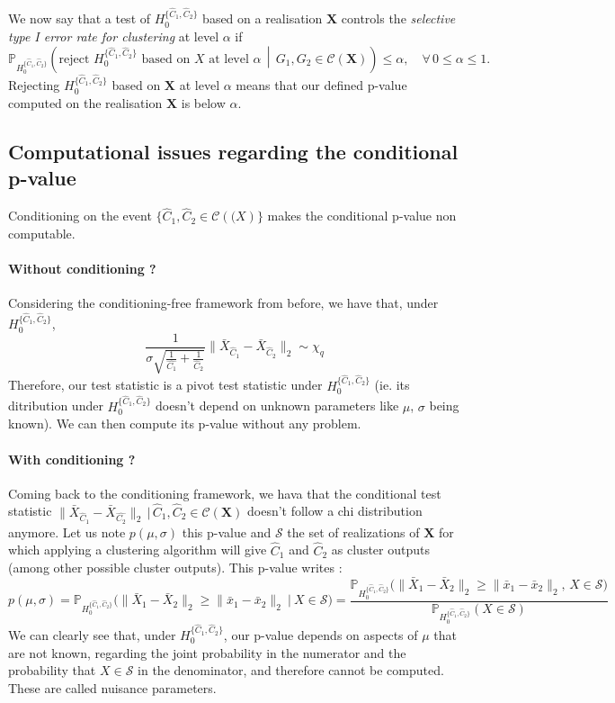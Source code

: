 \documentclass[11pt,a4paper]{article}
\newcommand{\C}{\mathcal{C}}                       %
\newcommand{\norm}[1]{\lVert #1 \rVert_2}          %
\newcommand{\Hzero}{H_0^{\{\hat{C}_1,\hat{C}_2\}}} %
\begin{document}
We now say that a test of $\Hzero$ based on a realisation $\mathbf{X}$ controls the \textit{selective type I error rate for clustering} at level $\alpha$ if
\[
\mathbb{P}_{\Hzero}\left( \text{reject } \Hzero \text{ based on } X \text{ at level } \alpha \,\middle|\, G_1, G_2 \in \C(\mathbf{X}) \right) \leq \alpha, \quad \forall\, 0 \leq \alpha \leq 1.
\]
Rejecting $\Hzero$ based on $\mathbf{X}$ at level $\alpha$ means that our defined p-value computed on the realisation $\mathbf{X}$ is below $\alpha$.

\subsection{Computational issues regarding the conditional p-value}

Conditioning on the event $\{\hat{C}_1, \hat{C}_2 \in \C(\mathbf(X)\}$ makes the conditional p-value non computable.

\paragraph{Without conditioning ?} Considering the conditioning-free framework from before, we have that, under $\Hzero$,
\[
\frac{1}{\sigma\sqrt{\frac{1}{\hat{C_1}} + \frac{1}{\hat{C}_2}}}\norm{\bar{X}_{\hat{C}_1} - \bar{X}_{\hat{C}_2}} \sim \chi_q
\]
Therefore, our test statistic is a pivot test statistic under $\Hzero$ (ie. its ditribution under $\Hzero$ doesn't depend on unknown parameters like $\mu$, $\sigma$ being known). We can then compute its p-value without any problem.

\paragraph{With conditioning ?} Coming back to the conditioning framework, we hava that the conditional test statistic $\norm{\bar{X}_{\hat{C}_1} - \bar{X}_{\hat{C_2}}} \, | \, \hat{C}_1, \hat{C}_2 \in \C(\mathbf{X})$ doesn't follow a chi distribution anymore. Let us note $p(\mu, \sigma)$ this p-value and $\mathcal{S}$ the set of realizations of $\mathbf{X}$ for which applying a clustering algorithm will give $\hat{C}_1$ and $\hat{C}_2$ as cluster outputs (among other possible cluster outputs). This p-value writes :
\[
p(\mu,\sigma)=\mathbb P_{\Hzero}\big(\norm{\bar{X}_1 - \bar{X}_2}\ge \norm{\bar{x}_1 - \bar{x}_2}\ \big|\ X\in\mathcal S\big)=\frac{\mathbb P_{\Hzero}\big(\norm{\bar{X}_1 - \bar{X}_2}\ge \norm{\bar{x}_1 - \bar{x}_2},\,X\in\mathcal S\big)}{\mathbb P_{\Hzero}(X\in\mathcal S)}
\]
We can clearly see that, under $\Hzero$, our p-value depends on aspects of $\mu$ that are not known, regarding the joint probability in the numerator and the probability that $X \in \mathcal{S}$ in the denominator, and therefore cannot be computed. These are called nuisance parameters.
\end{document}
